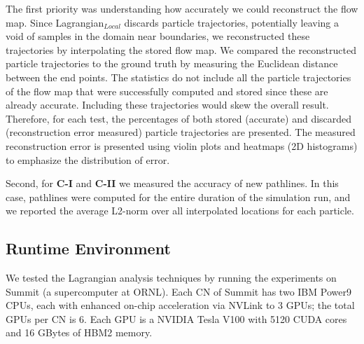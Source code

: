 The first priority was understanding how accurately we could reconstruct the flow map. 
%
Since Lagrangian$_{Local}$ discards particle trajectories, potentially leaving a void of samples in the domain near boundaries, we reconstructed these trajectories by interpolating the stored flow map.
%
We compared the reconstructed particle trajectories to the ground truth by measuring the Euclidean distance between the end points.
%
The statistics do not include all the particle trajectories of the flow map that were successfully computed and stored since these are already accurate.
%
Including these trajectories would skew the overall result.
%
Therefore, for each test, the percentages of both stored (accurate) and discarded (reconstruction error measured) particle trajectories are presented.
%
The measured reconstruction error is presented using violin plots and heatmaps (2D histograms) to emphasize the distribution of error. 

Second, for \textbf{C-I} and \textbf{C-II} we measured the accuracy of new pathlines.
%
In this case, pathlines were computed for the entire duration of the simulation run, and we reported the average L2-norm over all interpolated locations for each particle.
%

%
\vspace{-2mm}
\subsection{Runtime Environment}
\label{sec:runtime}
We tested the Lagrangian analysis techniques by running the experiments on Summit (a supercomputer at ORNL).
%
Each CN of Summit has two IBM Power9 CPUs,
%
each with enhanced on-chip acceleration via NVLink to 3 GPUs; the total GPUs per CN is 6.
%
Each GPU is a NVIDIA Tesla V100 with 5120 CUDA cores and 16 GBytes of HBM2 memory.
